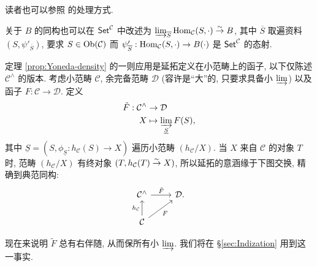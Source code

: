读者也可以参照 \cite[pp.76--77]{ML98} 的处理方式.

\begin{remark}\label{rem:Yoneda-density}
	关于 $B$ 的同构也可以在 $\mathsf{Set}^{\mathcal{C}}$ 中改述为 $\varinjlim_{\overline{S}} \operatorname{Hom}_{\mathcal{C}}(S, \cdot) \stackrel{\sim}{\rightarrow} B$, 其中 $\overline{S}$ 取遍资料 $(S, \psi'_{\overline{S}})$, 要求 $S \in \operatorname{Ob}(\mathcal{C})$ 而 $\psi'_{\overline{S}}: \operatorname{Hom}_{\mathcal{C}}(S, \cdot) \to B(\cdot)$ 是 $\mathsf{Set}^{\mathcal{C}}$ 的态射.
\end{remark}

定理 \ref{prop:Yoneda-density} 的一则应用是延拓定义在小范畴上的函子, 以下仅陈述 $\mathcal{C}^\wedge$ 的版本. 考虑小范畴 $\mathcal{C}$, 余完备范畴 $\mathcal{D}$ (容许是``大''的, 只要求具备小 $\varinjlim$) 以及函子 $F: \mathcal{C} \to \mathcal{D}$. 定义
\begin{equation}\label{eqn:Yoneda-F-tilde}\begin{aligned}
	\tilde{F}: \mathcal{C}^\wedge & \to \mathcal{D} \\
	X & \mapsto \varinjlim_{\underline{S}} F(S),
\end{aligned}\end{equation}
其中 $\underline{S} = \left( S, \phi_{\underline{S}}: h_{\mathcal{C}}(S) \to X\right)$ 遍历小范畴 $(h_{\mathcal{C}}/X)$. 当 $X$ 来自 $\mathcal{C}$ 的对象 $T$ 时, 范畴 $(h_{\mathcal{C}}/X)$ 有终对象 $(T, h_{\mathcal{C}}(T) \stackrel{\sim}{\rightarrow} X)$, 所以延拓的意涵缘于下图交换, 精确到典范同构:
\[\begin{tikzcd}
	\mathcal{C}^\wedge \arrow[r, "{\tilde{F}}"] & \mathcal{D}. \\
	\mathcal{C} \arrow[u, "{h_{\mathcal{C}}}"] \arrow[ru, "F"'] &
\end{tikzcd}\]

现在来说明 $\tilde{F}$ 总有右伴随, 从而保所有小 $\varinjlim$. 我们将在 \S\ref{sec:Indization} 用到这一事实.

